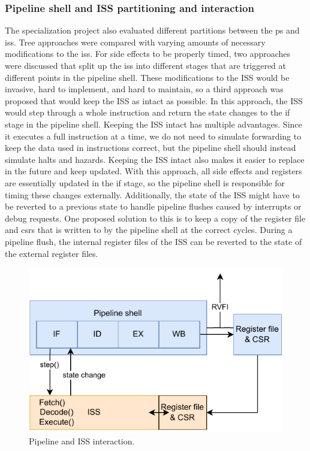 \subsubsection{Pipeline shell and ISS partitioning and interaction}
\label{sec:pw_partition}

The specialization project also evaluated different partitions between the \gls{ps} and \acrshort{iss}. Tree approaches were compared with varying amounts of necessary modifications to the \acrshort{iss}. For side effects to be properly timed, two approaches were discussed that split up the \acrshort{iss} into different stages that are triggered at different points in the pipeline shell. These modifications to the ISS would be invasive, hard to implement, and hard to maintain, so a third approach was proposed that would keep the ISS as intact as possible. In this approach, the ISS would step through a whole instruction and return the state changes to the \acrshort{if} stage in the pipeline shell. Keeping the ISS intact has multiple advantages. Since it executes a full instruction at a time, we do not need to simulate forwarding to keep the data used in instructions correct, but the pipeline shell should instead simulate halts and hazards. Keeping the ISS intact also makes it easier to replace in the future and keep updated. With this approach, all side effects and registers are essentially updated in the \acrshort{if} stage, so the pipeline shell is responsible for timing these changes externally. Additionally, the state of the ISS might have to be reverted to a previous state to handle pipeline flushes caused by interrupts or debug requests. One proposed solution to this is to keep a copy of the register file and \acrshort{csr}s that is written to by the pipeline shell at the correct cycles. During a pipeline flush, the internal register files of the ISS can be reverted to the state of the external register files.


\begin{figure}[htb]
    \centering
    \includegraphics[width=0.5\linewidth]{figures/pipeline-iss-3.pdf}
    \caption{Pipeline and ISS interaction.}
    \label{fig:pipeline-iss-3}
\end{figure}

